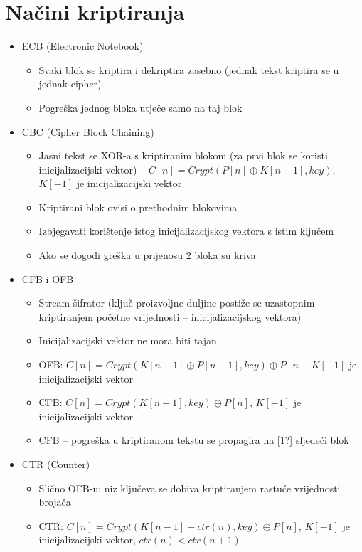 \documentclass[11pt]{article}
\begin{document}
\section{Načini kriptiranja}
\begin{itemize}
  \item ECB (Electronic Notebook)
\begin{itemize}
  \item Svaki blok se kriptira i dekriptira zasebno (jednak tekst kriptira se u jednak cipher)
  \item Pogreška jednog bloka utječe samo na taj blok
\end{itemize}
  \item CBC (Cipher Block Chaining)
\begin{itemize}
  \item Jasni tekst se XOR-a s kriptiranim blokom (za prvi blok  se koristi inicijalizacijski vektor) -- $C[n] = Crypt(P[n] \oplus K[n-1], key)$, $K[-1]$ je inicijalizacijski vektor
  \item Kriptirani blok ovisi o prethodnim blokovima
  \item Izbjegavati korištenje istog inicijalizacijskog vektora s istim ključem
  \item Ako se dogodi greška u prijenosu 2 bloka su kriva
\end{itemize}
  \item CFB i OFB
\begin{itemize}
  \item Stream šifrator (ključ proizvoljne duljine postiže se uzastopnim kriptiranjem početne vrijednosti -- inicijalizacijskog vektora)
  \item Inicijalizacijski vektor ne mora biti tajan
  \item OFB: $C[n] = Crypt(K[n-1] \oplus P[n-1], key) \oplus P[n]$, $K[-1]$ je inicijalizacijski vektor
  \item CFB: $C[n] = Crypt(K[n-1], key) \oplus P[n]$, $K[-1]$ je inicijalizacijski vektor
  \item CFB -- pogreška u kriptiranom tekstu se propagira na [1?] sljedeći blok
\end{itemize}
  \item CTR (Counter)
\begin{itemize}
  \item Slično OFB-u; niz ključeva se dobiva kriptiranjem rastuće vrijednosti brojača
  \item CTR: $C[n] = Crypt(K[n-1]+ctr(n), key) \oplus P[n]$, $K[-1]$ je inicijalizacijski vektor, $ctr(n) < ctr(n+1)$
\end{itemize}
\end{itemize}
\end{document}
